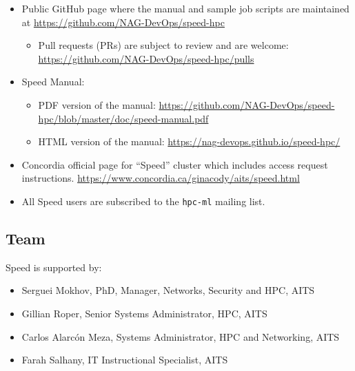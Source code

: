 \documentclass{easychair}
\begin{document}
\begin{itemize}
	\item
	Public GitHub page where the manual and sample job scripts are maintained at \url{https://github.com/NAG-DevOps/speed-hpc}
		\begin{itemize}
			\item Pull requests (PRs) are subject to review and are welcome: \url{https://github.com/NAG-DevOps/speed-hpc/pulls}
		\end{itemize}

	\item
	Speed Manual:
		\begin{itemize}
			\item PDF version of the manual: \url{https://github.com/NAG-DevOps/speed-hpc/blob/master/doc/speed-manual.pdf}
			\item HTML version of the manual: \url{https://nag-devops.github.io/speed-hpc/}
		\end{itemize}

	\item
	Concordia official page for ``Speed'' cluster which includes access request instructions.
	\url{https://www.concordia.ca/ginacody/aits/speed.html}

	\item
	All Speed users are subscribed to the \texttt{hpc-ml} mailing list.

\end{itemize}

\nocite{speed-intro-preso}

\subsection{Team}
\label{sect:speed-team}

Speed is supported by:
\begin{itemize}
	\item 
	Serguei Mokhov, PhD, Manager, Networks, Security and HPC, AITS
	\item 
	Gillian Roper, Senior Systems Administrator, HPC, AITS
	\item 
	Carlos Alarcón Meza, Systems Administrator, HPC and Networking, AITS
	\item 
	Farah Salhany, IT Instructional Specialist, AITS
\end{itemize}
\end{document}
